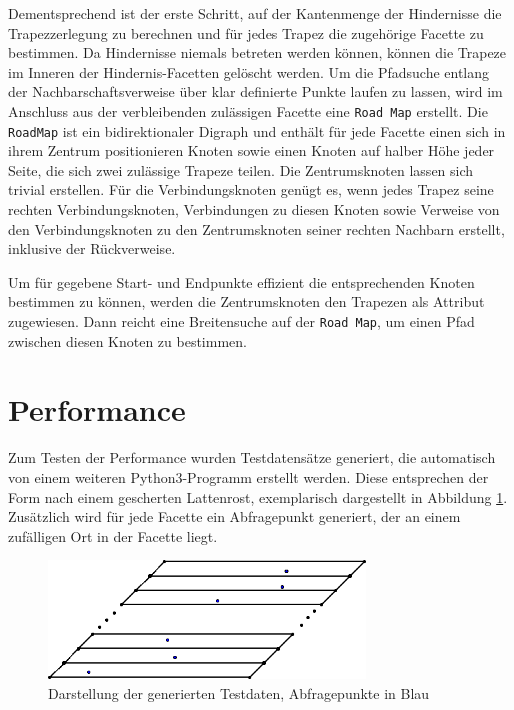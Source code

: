\documentclass[11pt, a4paper]{article}
\begin{document}
Dementsprechend ist der erste Schritt, auf der Kantenmenge der Hindernisse die Trapezzerlegung zu berechnen und für jedes Trapez die zugehörige Facette zu bestimmen. Da Hindernisse niemals betreten werden können, können die Trapeze im Inneren der Hindernis-Facetten gelöscht werden. Um die Pfadsuche entlang der Nachbarschaftsverweise über klar definierte Punkte laufen zu lassen, wird im Anschluss aus der verbleibenden zulässigen Facette eine \texttt{Road Map} erstellt. Die \texttt{RoadMap} ist ein bidirektionaler Digraph und enthält für jede Facette einen sich in ihrem Zentrum positionieren Knoten sowie einen Knoten auf halber Höhe jeder Seite, die sich zwei zulässige Trapeze teilen. Die Zentrumsknoten lassen sich trivial erstellen. Für die Verbindungsknoten genügt es, wenn jedes Trapez seine rechten Verbindungsknoten, Verbindungen zu diesen Knoten sowie Verweise von den Verbindungsknoten zu den Zentrumsknoten seiner rechten Nachbarn erstellt, inklusive der Rückverweise.

Um für gegebene Start- und Endpunkte effizient die entsprechenden Knoten bestimmen zu können, werden die Zentrumsknoten den Trapezen als Attribut zugewiesen. Dann reicht eine Breitensuche auf der \texttt{Road Map}, um einen Pfad zwischen diesen Knoten zu bestimmen.

\section{Performance}
\label{sec:performance}

Zum Testen der Performance wurden Testdatensätze generiert, die automatisch von einem weiteren Python3-Programm erstellt werden. Diese entsprechen der Form nach einem gescherten Lattenrost, exemplarisch dargestellt in Abbildung \ref{fig:generated_dataset}. Zusätzlich wird für jede Facette ein Abfragepunkt generiert, der an einem zufälligen Ort in der Facette liegt.

\begin{figure}[h!]
	\centering
	\includegraphics[width=0.75\textwidth]{generated_dataset}
	\caption{Darstellung der generierten Testdaten, Abfragepunkte in Blau}
	\label{fig:generated_dataset}
\end{figure}
\end{document}
